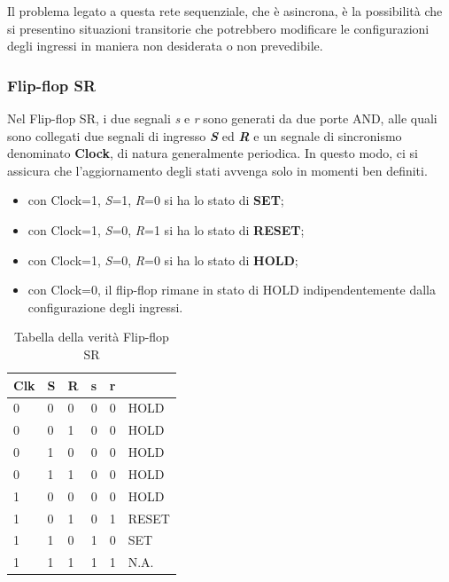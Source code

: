 \documentclass[10pt]{article}
\begin{document}
\begin{itemize}
Il problema legato a questa rete sequenziale, che è asincrona, è la possibilità che si presentino situazioni transitorie che potrebbero modificare le configurazioni degli ingressi in maniera non desiderata o 
non prevedibile.

\subsubsection{Flip-flop SR}
Nel Flip-flop SR, i due segnali \emph{s} e \emph{r} sono generati da due porte AND, alle quali sono collegati due segnali di ingresso \textbf{\emph{S}} ed \textbf{\emph{R}} 
e un segnale di sincronismo denominato \textbf{Clock}, di natura generalmente periodica. 
In questo modo, ci si assicura che l'aggiornamento degli stati avvenga solo in momenti ben definiti.
\begin{itemize}
    \item con Clock=1, \emph{S}=1, \emph{R}=0 si ha lo stato di \textbf{SET};
    \item con Clock=1, \emph{S}=0, \emph{R}=1 si ha lo stato di \textbf{RESET};
    \item con Clock=1, \emph{S}=0, \emph{R}=0 si ha lo stato di \textbf{HOLD};
    \item con Clock=0, il flip-flop rimane in stato di HOLD indipendentemente dalla configurazione degli ingressi.
\end{itemize}

\begin{table}[H]
    \begin{minipage}[b]{\textwidth}
    \centering
    \begin{tabular}{|lll|ll|l|}
        \hline
        \textbf{Clk} & \textbf{S} & \textbf{R} & \textbf{s} & \textbf{r} &       \\ \hline
        0            & 0          & 0          & 0          & 0          & HOLD  \\ 
        0            & 0          & 1          & 0          & 0          & HOLD  \\ 
        0            & 1          & 0          & 0          & 0          & HOLD  \\ 
        0            & 1          & 1          & 0          & 0          & HOLD  \\ 
        1            & 0          & 0          & 0          & 0          & HOLD  \\ 
        1            & 0          & 1          & 0          & 1          & RESET \\ 
        1            & 1          & 0          & 1          & 0          & SET   \\ 
        1            & 1          & 1          & 1          & 1          & N.A.  \\ \hline
        \end{tabular}
        \caption{Tabella della verità Flip-flop SR}
        \label{tab:my-table}
    \end{minipage}
    \end{table}


\end{itemize}
\end{document}
